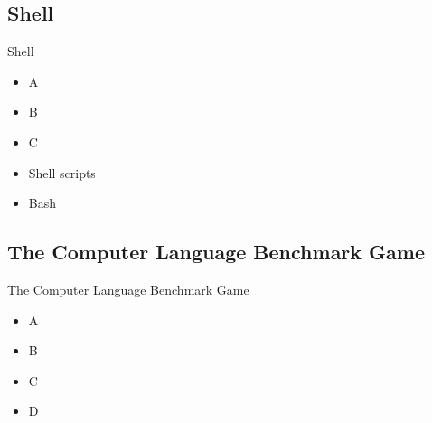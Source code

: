 \subsection{Shell}
\begin{frame}{Shell}
    \begin{itemize}
        \item A
        \item B
        \item C 
        \item Shell scripts
        \item Bash
    \end{itemize}
\end{frame}

\subsection{The Computer Language Benchmark Game}
\begin{frame}{The Computer Language Benchmark Game}
    \begin{itemize}
        \item A
        \item B
        \item C 
        \item D 
    \end{itemize}
\end{frame}
